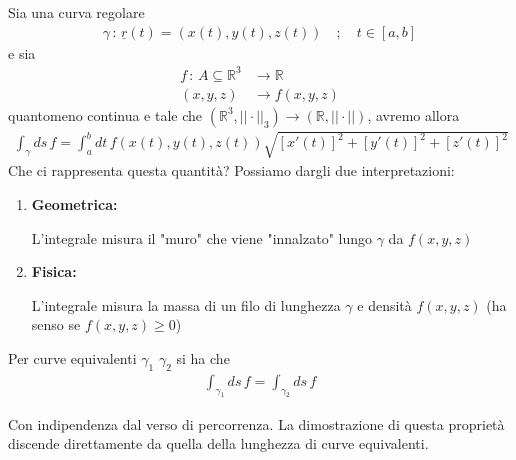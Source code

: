 Sia una curva regolare 
\begin{align}
\gamma \, : \, \underline{r}(t)=(x(t),y(t),z(t)) \quad ; \quad t \in [a,b]
\end{align}
e sia
\begin{align}
f \, : \, A \subseteq \mathbb{R}^3 {}&\longrightarrow \mathbb{R} \\
(x,y,z) & \longrightarrow f(x,y,z)
\end{align}
quantomeno continua e tale che $(\mathbb{R}^3, ||\cdot||_3) \longrightarrow (\mathbb{R},||\cdot||)$, avremo allora
\begin{align}
\int_{\gamma} ds \, f = \int_{a}^{b} dt \, f(x(t),y(t),z(t))\sqrt{[x'(t)]^2 + [y'(t)]^2 + [z'(t)]^2}
\end{align}
Che ci rappresenta questa quantità? Possiamo dargli due interpretazioni:
\begin{enumerate}
	\item \textbf{Geometrica:}

	\begin{figure}[!htb]
	\end{figure}
	
	L'integrale misura il "muro" che viene "innalzato" lungo $\gamma$ da $f(x,y,z)$
	
	\item \textbf{Fisica:}

	L'integrale misura la massa di un filo di lunghezza $\gamma$ e densità $f(x,y,z)$ (ha senso se $f(x,y,z)\geq 0$)
\end{enumerate}

Per curve equivalenti $\gamma_1$ $\gamma_2$ si ha che 
\begin{align}
\int_{\gamma_1} ds \, f = \int_{\gamma_2} ds \, f
\end{align}

Con indipendenza dal verso di percorrenza. La dimostrazione di questa proprietà discende direttamente da quella della lunghezza di curve equivalenti.


